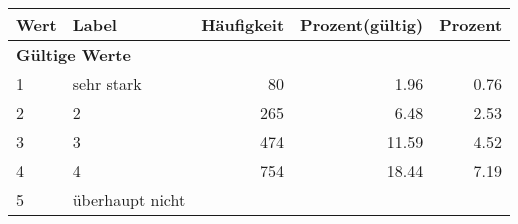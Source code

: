      \begin{longtable}{lXrrr}
     \toprule
     \textbf{Wert} & \textbf{Label} & \textbf{Häufigkeit} & \textbf{Prozent(gültig)} & \textbf{Prozent} \\
     \endhead
     \midrule
     \multicolumn{5}{l}{\textbf{Gültige Werte}}\\

     1 &
     \multicolumn{1}{X}{ sehr stark   } &


       \num{80} &
       \num[round-mode=places,round-precision=2]{1,96} &
         \num[round-mode=places,round-precision=2]{0,76} \\

     2 &
     \multicolumn{1}{X}{ 2   } &


       \num{265} &
       \num[round-mode=places,round-precision=2]{6,48} &
         \num[round-mode=places,round-precision=2]{2,53} \\

     3 &
     \multicolumn{1}{X}{ 3   } &


       \num{474} &
       \num[round-mode=places,round-precision=2]{11,59} &
         \num[round-mode=places,round-precision=2]{4,52} \\

     4 &
     \multicolumn{1}{X}{ 4   } &


       \num{754} &
       \num[round-mode=places,round-precision=2]{18,44} &
         \num[round-mode=places,round-precision=2]{7,19} \\

     5 &
     \multicolumn{1}{X}{ überhaupt nicht   } &



\end{longtable}
